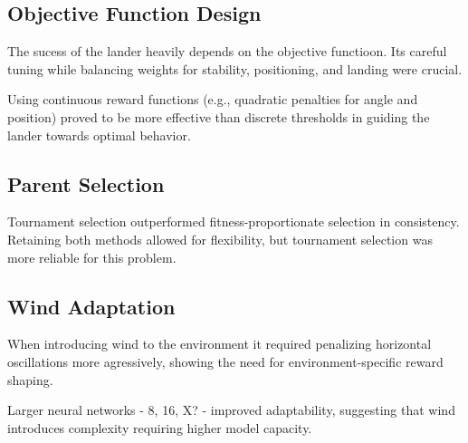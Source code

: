 \documentclass{article}
\begin{document}
\subsection{Objective Function Design}

The sucess of the lander heavily depends on the objective functioon. Its careful tuning while balancing weights for stability, positioning, and landing were crucial.

Using continuous reward functions (e.g., quadratic penalties for angle and position) proved to be more effective than discrete thresholds in guiding the lander towards optimal behavior.

\subsection{Parent Selection}

Tournament selection outperformed fitness-proportionate selection in consistency. Retaining both methods allowed for flexibility, but tournament selection was more reliable for this problem.

\subsection{Wind Adaptation}
When introducing wind to the environment it required penalizing horizontal oscillations more agressively, showing the need for environment-specific reward shaping.

Larger neural networks - 8, 16, X? - improved adaptability, suggesting that wind introduces complexity requiring higher model capacity.
\end{document}
